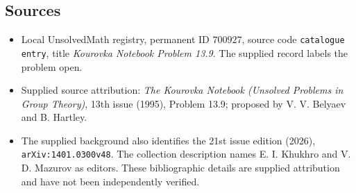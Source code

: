 \documentclass[11pt]{article}
\begin{document}
\subsection{Sources}
\begin{itemize}
\item Local UnsolvedMath registry, permanent ID \(700927\), source code \texttt{catalogue entry}, title \emph{Kourovka Notebook Problem 13.9}. The supplied record labels the problem open.
\item Supplied source attribution: \emph{The Kourovka Notebook (Unsolved Problems in Group Theory)}, 13th issue (1995), Problem 13.9; proposed by V. V. Belyaev and B. Hartley.
\item The supplied background also identifies the 21st issue edition (2026), \texttt{arXiv:1401.0300v48}. The collection description names E. I. Khukhro and V. D. Mazurov as editors. These bibliographic details are supplied attribution and have not been independently verified.
\end{itemize}
\end{document}
